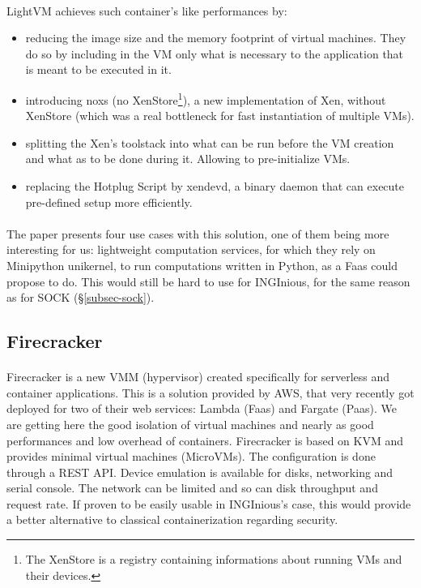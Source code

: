 \paragraph{}LightVM achieves such container's like performances by:
\begin{itemize}
\renewcommand\labelitemi{--}
  \item reducing the image size and the memory footprint of virtual machines.  They do so by including in the VM only what is necessary to the application that is meant to be executed in it.
  \item introducing noxs (no XenStore\footnote{The XenStore is a registry containing informations about running VMs and their devices.}), a new implementation of Xen, without XenStore (which was a real bottleneck for fast instantiation of multiple VMs).
  \item splitting the Xen's toolstack into what can be run before the VM creation and what as to be done during it.  Allowing to pre-initialize VMs.
  \item replacing the Hotplug Script by xendevd, a binary daemon that can execute pre-defined setup more efficiently.
\end{itemize}

\paragraph{} The paper presents four use cases with this solution, one of them being more interesting for us: lightweight computation services, for which they rely on Minipython unikernel, to run computations written in Python, as a Faas could propose to do.  This would still be hard to use for INGInious, for the same reason as for SOCK (§\ref{subsec-sock}).

\subsection{Firecracker} 
\paragraph{} Firecracker is a new VMM (hypervisor) created specifically for serverless and container applications.  \cite{agachefirecracker}  This is a solution provided by AWS, that very recently got deployed for two of their web services: Lambda (Faas) and Fargate (Paas).  We are getting here the good isolation of virtual machines and nearly as good performances and low overhead of containers.  Firecracker is based on KVM and provides minimal virtual machines (MicroVMs).  The configuration is done through a REST API.  Device emulation is available for disks, networking and serial console.  The network can be limited and so can disk throughput and request rate.  If proven to be easily usable in INGInious's case, this would provide a better alternative to classical containerization regarding security.

